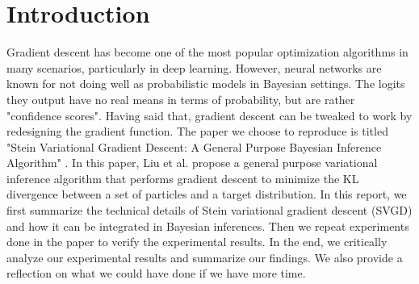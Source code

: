 \section{Introduction}
Gradient descent has become one of the most popular optimization algorithms in many scenarios, particularly in deep learning. However, neural networks are known for not doing well as probabilistic models in Bayesian settings. The logits they output have no real means in terms of probability, but are rather "confidence scores". Having said that, gradient descent can be tweaked to work by redesigning the gradient function. The paper we choose to reproduce is titled "Stein Variational Gradient Descent: A General Purpose Bayesian Inference Algorithm" \cite{ref_article_svgd}. In this paper, Liu et al. propose a general purpose variational inference algorithm that performs gradient descent to minimize the KL divergence between a set of particles and a target distribution. In this report, we first summarize the technical details of Stein variational gradient descent (SVGD) and how it can be integrated in Bayesian inferences. Then we repeat experiments done in the paper to verify the experimental results. In the end, we critically analyze our experimental results and summarize our findings. We also provide a reflection on what we could have done if we have more time.